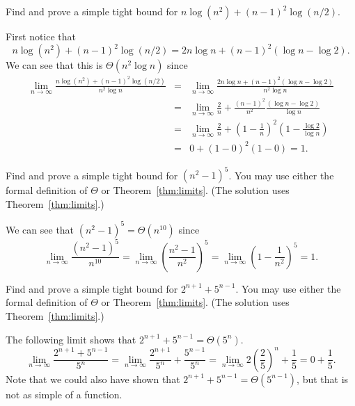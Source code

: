 \begin{exa}
Find and prove a simple tight bound for  $n\log(n^2)+(n-1)^2\log(n/2)$.
\begin{sol}
First notice that 
$$n\log(n^2)+(n-1)^2\log(n/2)=2n\log n + (n-1)^2(\log n - \log 2).$$
We can see that this is $\Theta(n^2\log n)$ since 
\begin{eqnarray*}
\lim_{n\rightarrow\infty}\frac{n\log(n^2)+(n-1)^2\log(n/2)}{n^2\log n}
&=&\lim_{n\rightarrow\infty}\frac{2n\log n + (n-1)^2(\log n - \log 2)}{n^2\log n}\\
&=&\lim_{n\rightarrow\infty}\frac{2}{n} + \frac{(n-1)^2}{n^2}\frac{(\log n - \log 2)}{\log n}\\
&=&\lim_{n\rightarrow\infty}\frac{2}{n} + \left(1-\frac{1}{n}\right)^2\left(1-\frac{\log 2}{\log n}\right)\\
&=&0+(1-0)^2(1-0) = 1.
\end{eqnarray*}
\end{sol}
\end{exa}

\begin{exer}
Find and prove a simple tight bound for $(n^2-1)^5$.
You may use either the formal definition of $\Theta$ or Theorem~\ref{thm:limits}.
(The solution uses Theorem~\ref{thm:limits}.)

\vspace*{4in}
\begin{answer}
We can see that $(n^2-1)^5=\Theta(n^{10})$ since 
$$\lim_{n\rightarrow\infty}\frac{(n^2-1)^5}{n^{10}}
=\lim_{n\rightarrow\infty}\left(\frac{n^2-1}{n^2}\right)^5
=\lim_{n\rightarrow\infty}\left(1 - \frac{1}{n^2}\right)^5
=1
.$$
\end{answer}
\end{exer}

\newpage

\begin{exer}
Find and prove a simple tight bound for $2^{n+1}+5^{n-1}$.
You may use either the formal definition of $\Theta$ or Theorem~\ref{thm:limits}.
(The solution uses Theorem~\ref{thm:limits}.)

\vspace*{4in}
\begin{answer}
The following limit shows that $2^{n+1}+5^{n-1}=\Theta(5^n)$.
$$\lim_{n\rightarrow\infty}\frac{2^{n+1}+5^{n-1}}{5^n}
=\lim_{n\rightarrow\infty}\frac{2^{n+1}}{5^n}+\frac{5^{n-1}}{5^n}
=\lim_{n\rightarrow\infty}2\left(\frac{2}{5}\right)^n+\frac{1}{5}
=0+\frac{1}{5}.
$$
Note that we could also have shown that $2^{n+1}+5^{n-1}=\Theta(5^{n-1})$,
but that is not as simple of a function.
\end{answer}
\end{exer}

